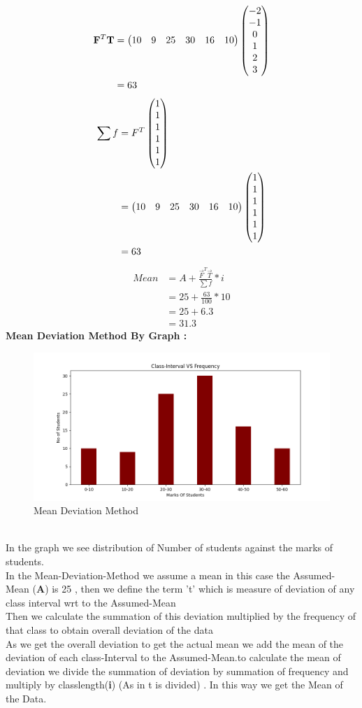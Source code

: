 \documentclass[journal,12pt,twocolumn]{IEEEtran}
\begin{document}
\begin{align}
\mathbf{F}^{T}\mathbf{T}  & =\begin{pmatrix}10 & 9 & 25 & 30 & 16 & 10\end{pmatrix}\begin{pmatrix}-2\\-1\\0\\1\\2\\3\end{pmatrix}\\ 
                    & = 63
\end{align}
\begin{align}
\sum f & = F^{T} \begin{pmatrix}1\\1\\1\\1\\1\\1\end{pmatrix}\\
	   & = \begin{pmatrix}10 & 9 & 25 & 30 & 16 & 10\end{pmatrix}\begin{pmatrix}1\\1\\1\\1\\1\\1\end{pmatrix}\\
       & = 63
\end{align}
\begin{align}
Mean & = A + \frac{ \vec{F}^{T}\vec{T} }{\sum f} * i\\
     & = 25 + \frac{63}{100} * 10\\
     & = 25 + 6.3\\
     & = 31.3
\end{align}
\textbf{Mean Deviation Method By Graph :}
\begin{figure}[h]
\centering
\includegraphics[width=\columnwidth]{Assig-1-figure.png}
\caption{Mean Deviation Method}
\label{Fig1}
\end{figure}\\
In the graph we see distribution of Number of students against the marks of students.\\In the Mean-Deviation-Method we assume a mean in this case the Assumed-Mean (\textbf{A}) is 25 , then we define the term 't' which is measure of deviation of any class interval wrt to the Assumed-Mean \\Then we calculate the summation of this deviation multiplied by the frequency of that class to obtain overall deviation of the data \\As we get the overall deviation to get the actual mean we add the mean of the deviation of each class-Interval to the Assumed-Mean.to calculate the mean of deviation we divide the summation of deviation by summation of frequency and multiply by classlength(\textbf{i}) (As in t is divided) . In this way we get the Mean of the Data.
\end{document}
